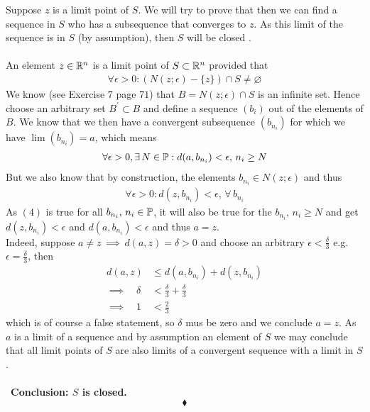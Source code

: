 Suppose $z$ is a limit point of $S$. We will try to prove that then we can find a sequence in $S$ who has a subsequence that converges to $z$. As this limit of the sequence is in $S$ (by assumption), then $S$ will be closed .\\\\
An element $z\in\mathbb{R}^n$ is a limit point of $S\subset \mathbb{R}^n$ provided that 
\begin{align*}
\forall \epsilon>0: \left(N(z;\epsilon)-\{z\}\right)\cap S\neq \varnothing
\end{align*}
We know (see Exercise $7$ page $71$) that $B=N(z;\epsilon)\cap S$ is an infinite set. Hence choose an arbitrary set $B^{'}\subset B$ and define a sequence $(b_i)$ out of the elements of $B$. We know that we then have a convergent subsequence $(b_{n_i})$ for which we have $\lim (b_{n_i}) = a$, which means
\begin{align*}
\forall\epsilon>0, \exists\, N\in\mathbb{P}: d(a,b_{n_i})< \epsilon ,\, n_i\geq N
\end{align*}
But we also know that by construction, the elements $b_{n_i}\in N(z;\epsilon)$ and thus 
\begin{align}
\forall\epsilon>0: d(z,b_{n_i})< \epsilon ,\, \forall\,  b_{n_i}
\end{align}
As $(4)$ is true for all $b_{n_i},\, n_i\in\mathbb{P}$, it will also be true for the $b_{n_i},\, n_i\geq N$ and get $d(z,b_{n_i})< \epsilon$ and $d(a,b_{n_i})< \epsilon$ and thus $a=z$. \\
Indeed, suppose $a\ne z\,\implies\, d(a,z)=\delta >0$ and choose an arbitrary $\epsilon <\frac{\delta}{3}$ e.g. $\epsilon =\frac{\delta}{3}$, then
\begin{align*}
d(a,z)&\leq d(a,b_{n_i})+d(z,b_{n_i})\\
\implies\quad\delta&<\frac{\delta}{3}+\frac{\delta}{3}\\
\implies\quad 1&<\frac{2}{3}
\end{align*}
which is of course a false statement, so $\delta$ mus be zero and we conclude $a=z$. As $a$ is a limit of a sequence and by assumption an element of $S$ we may conclude that all limit points of  $S$ are also limits of a convergent sequence with a limit in $S$. \\\\\
\textbf{Conclusion: $S$ is closed.}
$$\blacklozenge$$\\

\newpage

